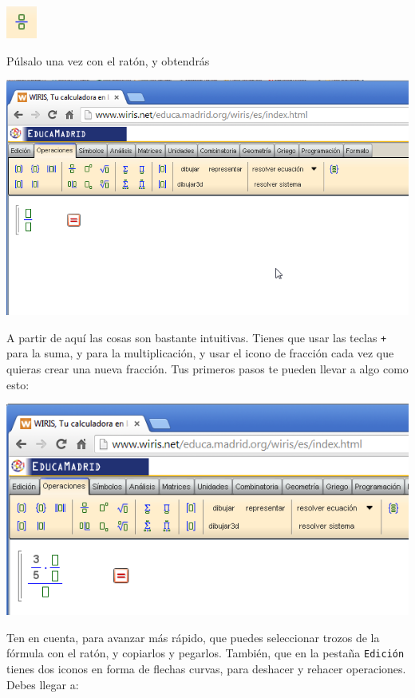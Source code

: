 \documentclass[10pt,a4paper]{article}\usepackage[]{graphicx}\usepackage[]{color}
\begin{document}
    \begin{center}
    \includegraphics[width=1cm]{../fig/Tut04-10.png}
    \end{center}
Púlsalo una vez con el ratón, y obtendrás
    \begin{center}
    \includegraphics[width=15cm]{../fig/Tut04-11.png}
    \end{center}
A partir de aquí las cosas son bastante intuitivas. Tienes que usar las teclas {\tt +} para la suma, y {\tt *} para la multiplicación, y usar el icono de fracción cada vez que quieras crear una nueva fracción. Tus primeros pasos te pueden llevar a algo como esto:
    \begin{center}
    \includegraphics[width=15.5cm]{../fig/Tut04-12.png}
    \end{center}
Ten en cuenta, para avanzar más rápido, que puedes seleccionar trozos de la fórmula con el ratón, y copiarlos y pegarlos. También, que en la pestaña {\tt Edición} tienes dos iconos en forma de flechas curvas, para deshacer y rehacer operaciones. Debes llegar a:
\end{document}
